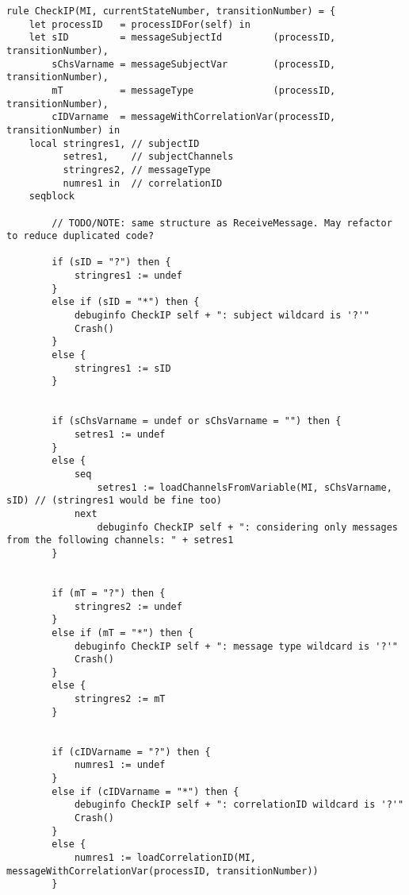 \begin{listing}[H]
\begin{verbatim}
rule CheckIP(MI, currentStateNumber, transitionNumber) = {
    let processID   = processIDFor(self) in
    let sID         = messageSubjectId         (processID, transitionNumber),
        sChsVarname = messageSubjectVar        (processID, transitionNumber),
        mT          = messageType              (processID, transitionNumber),
        cIDVarname  = messageWithCorrelationVar(processID, transitionNumber) in
    local stringres1, // subjectID
          setres1,    // subjectChannels
          stringres2, // messageType
          numres1 in  // correlationID
    seqblock

        // TODO/NOTE: same structure as ReceiveMessage. May refactor to reduce duplicated code?

        if (sID = "?") then {
            stringres1 := undef
        }
        else if (sID = "*") then {
            debuginfo CheckIP self + ": subject wildcard is '?'"
            Crash()
        }
        else {
            stringres1 := sID
        }


        if (sChsVarname = undef or sChsVarname = "") then {
            setres1 := undef
        }
        else {
            seq
                setres1 := loadChannelsFromVariable(MI, sChsVarname, sID) // (stringres1 would be fine too)
            next
                debuginfo CheckIP self + ": considering only messages from the following channels: " + setres1
        }


        if (mT = "?") then {
            stringres2 := undef
        }
        else if (mT = "*") then {
            debuginfo CheckIP self + ": message type wildcard is '?'"
            Crash()
        }
        else {
            stringres2 := mT
        }


        if (cIDVarname = "?") then {
            numres1 := undef
        }
        else if (cIDVarname = "*") then {
            debuginfo CheckIP self + ": correlationID wildcard is '?'"
            Crash()
        }
        else {
            numres1 := loadCorrelationID(MI, messageWithCorrelationVar(processID, transitionNumber))
        }



\end{verbatim}
\end{listing}
